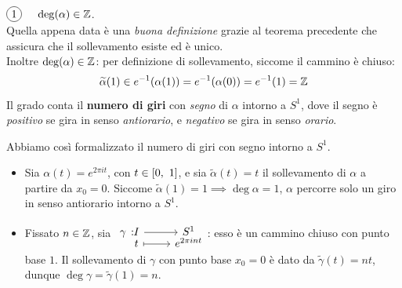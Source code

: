 \begin{observe} $\circled{1}\quad$ \textsc{$\deg(\alpha)\in\mathbb{Z}$.}\\
	Quella appena data è una \textit{buona definizione} grazie al teorema precedente che assicura che il sollevamento esiste ed è unico. \\
	Inoltre $\deg(\alpha)\in\mathbb{Z}$: per definizione di sollevamento, siccome il cammino è chiuso:
	\begin{equation*}
		\widetilde{\alpha}(1)\in e^{-1}(\alpha(1))=e^{-1}(\alpha(0))=e^{-1}(1)=\mathbb{Z}
	\end{equation*}
	Il grado conta il \textbf{numero di giri} con \textit{segno} di $\alpha$ intorno a $S^1$, dove il segno è \textit{positivo} se gira in senso \textit{antiorario}, e \textit{negativo} se gira in senso \textit{orario}.
\end{observe}
Abbiamo così formalizzato il numero di giri con segno intorno a $S^1$.
\begin{examples}
	\begin{itemize} 
		\item Sia $\alpha(t)=e^{2\pi i t}$, con $t\in\left[0,\ 1\right]$, e sia $\widetilde{\alpha}(t)=t$ il sollevamento di $\alpha$ a partire da $x_0=0$. Siccome $\widetilde{\alpha}(1)=1\implies \deg\alpha=1$, $\alpha$ percorre solo un giro in senso antiorario intorno a $S^1$.
		\item Fissato $n\in\mathbb{Z}$, sia $\displaystyle \funztot \gamma I {S^1} t {e^{2\pi i nt}}$: esso è un cammino chiuso con punto base $1$. Il sollevamento di $\gamma$ con punto base $x_0=0$ è dato da $\widetilde{\gamma}(t)=nt$, dunque $\deg\gamma=\widetilde{\gamma}(1)=n$.
	\end{itemize}
\vspace{-3mm}
\end{examples}

